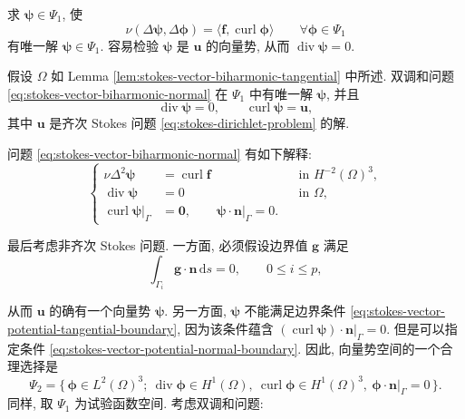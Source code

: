求 $\boldsymbol{\psi}\in\Psi_1$, 使
\begin{equation}\label{eq:stokes-vector-biharmonic-normal}
\nu(\Delta\boldsymbol{\psi},
\Delta\boldsymbol{\phi})
=
\langle\mathbf{f},
\operatorname{curl}\boldsymbol{\phi}\rangle
\qquad
\forall\boldsymbol{\phi}\in\Psi_1
\end{equation}
有唯一解 $\boldsymbol{\psi}\in\Psi_1$.
容易检验 $\boldsymbol{\psi}$ 是 $\mathbf{u}$ 的向量势,
从而 $\operatorname{div}\boldsymbol{\psi}=0$.

\setcounter{statement}{3}
\begin{Lemma}\label{lem:stokes-vector-biharmonic-normal}
假设 $\Omega$ 如 Lemma
\ref{lem:stokes-vector-biharmonic-tangential} 中所述.
双调和问题 \eqref{eq:stokes-vector-biharmonic-normal}
在 $\Psi_1$ 中有唯一解 $\boldsymbol{\psi}$, 并且
\[
\operatorname{div}\boldsymbol{\psi}=0,
\qquad
\operatorname{curl}\boldsymbol{\psi}=\mathbf{u},
\]
其中 $\mathbf{u}$ 是齐次 Stokes 问题
\eqref{eq:stokes-dirichlet-problem} 的解.
\end{Lemma}

\setcounter{statement}{9}
\begin{Remark}\label{rem:stokes-vector-biharmonic-normal-strong-form}
问题 \eqref{eq:stokes-vector-biharmonic-normal} 有如下解释:
\begin{equation}\label{eq:stokes-vector-biharmonic-normal-strong}
\left\{
\begin{aligned}
\nu\Delta^2\boldsymbol{\psi}
&=\operatorname{curl}\mathbf{f}
&&\text{in }H^{-2}(\Omega)^3,\\
\operatorname{div}\boldsymbol{\psi}&=0
&&\text{in }\Omega,\\
\operatorname{curl}\boldsymbol{\psi}|_\Gamma&=\mathbf{0},
\qquad
\boldsymbol{\psi}\cdot\mathbf{n}|_\Gamma=0.
\end{aligned}
\right.
\end{equation}
\end{Remark}

最后考虑非齐次 Stokes 问题. 一方面, 必须假设边界值
$\mathbf{g}$ 满足
\begin{equation}\label{eq:stokes-vector-nonhomogeneous-flux}
\int_{\Gamma_i}\mathbf{g}\cdot\mathbf{n}\,\mathrm{d}s=0,
\qquad 0\le i\le p,
\end{equation}

从而 $\mathbf{u}$ 的确有一个向量势 $\boldsymbol{\psi}$.
另一方面, $\boldsymbol{\psi}$ 不能满足边界条件
\eqref{eq:stokes-vector-potential-tangential-boundary},
因为该条件蕴含
$(\operatorname{curl}\boldsymbol{\psi})
\cdot\mathbf{n}|_\Gamma=0$.
但是可以指定条件
\eqref{eq:stokes-vector-potential-normal-boundary}.
因此, 向量势空间的一个合理选择是
\[
\Psi_2
=
\{\,\boldsymbol{\phi}\in L^2(\Omega)^3;
\ \operatorname{div}\boldsymbol{\phi}\in H^1(\Omega),\
\operatorname{curl}\boldsymbol{\phi}\in H^1(\Omega)^3,\
\boldsymbol{\phi}\cdot\mathbf{n}|_\Gamma=0\,\}.
\]
同样, 取 $\Psi_1$ 为试验函数空间. 考虑双调和问题:

